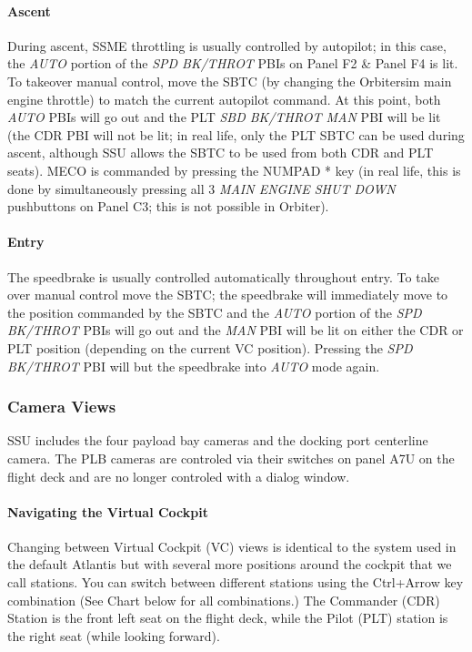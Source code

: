 \documentclass[13pt]{article}
\begin{document}
\begin{multicols}{2}
\paragraph{Ascent}
During ascent, SSME throttling is usually controlled by autopilot; in this case, the \textit{AUTO} portion of the \textit{SPD BK/THROT} PBIs on Panel F2 \& Panel F4 is lit. To takeover manual control, move the SBTC (by changing the Orbitersim main engine throttle) to match the current autopilot command. At this point, both \textit{AUTO} PBIs will go out and the PLT \textit{SBD BK/THROT MAN} PBI will be lit (the CDR PBI will not be lit; in real life, only the PLT SBTC can be used during ascent, although SSU allows the SBTC to be used from both CDR and PLT seats). MECO is commanded by pressing the NUMPAD * key (in real life, this is done by simultaneously pressing all 3 \textit{MAIN ENGINE SHUT DOWN} pushbuttons on Panel C3; this is not possible in Orbiter).

\paragraph{Entry}
The speedbrake is usually controlled automatically throughout entry. To take over manual control move the SBTC; the speedbrake will immediately move to the position commanded by the SBTC and the \textit{AUTO} portion of the \textit{SPD BK/THROT} PBIs will go out and the \textit{MAN} PBI will be lit on either the CDR or PLT position (depending on the current VC position). Pressing the \textit{SPD BK/THROT} PBI will but the speedbrake into \textit{AUTO} mode again.


\subsubsection{\large Camera Views}
SSU includes the four payload bay cameras and the docking port centerline camera. The PLB cameras are controled via their switches on panel A7U on the flight deck and are no longer controled with a dialog window.

\paragraph{Navigating the Virtual Cockpit}
Changing between Virtual Cockpit (VC) views is identical to the system used in the default Atlantis but with several more positions around the cockpit that we call stations. You can switch between different stations using the Ctrl+Arrow key combination (See Chart below for all combinations.) The Commander (CDR) Station is the front left seat on the flight deck, while the Pilot (PLT) station is the right seat (while looking forward).\\


\end{multicols}
\end{document}
